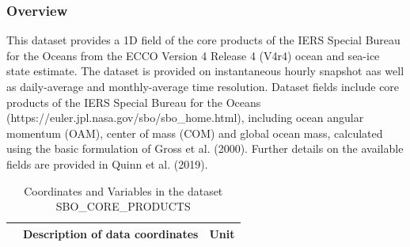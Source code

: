 \subsubsection{Overview}
This dataset provides a 1D field of the core products of the IERS Special Bureau for the Oceans from the ECCO Version 4 Release 4 (V4r4) ocean and sea-ice state estimate. The dataset is provided on instantaneous hourly snapshot aas well as daily-average and monthly-average time resolution. Dataset fields include core products of the IERS Special Bureau for the Oceans (https://euler.jpl.nasa.gov/sbo/sbo\_home.html), including ocean angular momentum (OAM), center of mass (COM) and global ocean mass, calculated using the basic formulation of Gross et al. (2000). Further details on the available fields are provided in Quinn et al. (2019). 
\begin{longtable}{|m{}|m{}|m{}|}
\caption{Coordinates and Variables in the dataset SBO\_CORE\_PRODUCTS}
\label{tab:table-<xarray.Dataset> Size: 49MB
Dimensions:    (time: 227904)
Coordinates:
  * time       (time) datetime64[ns] 2MB 1992-01-01T13:00:00 ... 2017-12-31T1...
Data variables: (12/26)
    xoamc      (time) float64 2MB ...
    yoamc      (time) float64 2MB ...
    zoamc      (time) float64 2MB ...
    xoamp      (time) float64 2MB ...
    yoamp      (time) float64 2MB ...
    zoamp      (time) float64 2MB ...
    ...         ...
    ycom_fw    (time) float64 2MB ...
    zcom_fw    (time) float64 2MB ...
    mass_gc    (time) float64 2MB ...
    xoamp_dsl  (time) float64 2MB ...
    yoamp_dsl  (time) float64 2MB ...
    zoamp_dsl  (time) float64 2MB ...
Attributes: (12/48)
    acknowledgement:              This research was carried out by the Jet Pr...
    author:                       Ian Fenty and Ou Wang
    cdm_data_type:                Grid
    comment:                      1D time series calculated from fields on th...
    Conventions:                  CF-1.8, ACDD-1.3
    coordinates_comment:          Note: the global 'coordinates' attribute de...
    ...                           ...
    time_coverage_duration:       P0S
    time_coverage_end:            2017-12-31T12:00:00
    time_coverage_resolution:     P0S
    time_coverage_start:          1992-01-01T12:00:00
    title:                        ECCO SBO Core Products - Snapshot (Version ...
    uuid:                         9429992a-86d8-11eb-a688-f8f21e2ee3e0-fields} \\ 
\hline \endhead \hline \endfoot
\rowcolor{lightgray} \multicolumn{1}{|c|}{\textbf{Coordinates}} & \multicolumn{1}{|c|}{\textbf{Description of data coordinates}} &  \multicolumn{1}{|c|}{\textbf{Unit}}\\ \hline

\end{longtable}
